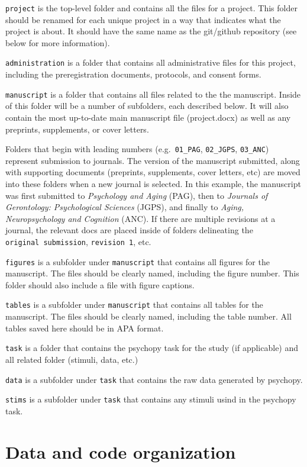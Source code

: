 \documentclass[
]{book}
\begin{document}
\texttt{project} is the top-level folder and contains all the files for a project. This folder should be renamed for each unique project in a way that indicates what the project is about. It should have the same name as the git/github repository (see below for more information).

\texttt{administration} is a folder that contains all administrative files for this project, including the preregistration documents, protocols, and consent forms.

\texttt{manuscript} is a folder that contains all files related to the the manuscript. Inside of this folder will be a number of subfolders, each described below. It will also contain the most up-to-date main manuscript file (project.docx) as well as any preprints, supplements, or cover letters.

Folders that begin with leading numbers (e.g.~\texttt{01\_PAG}, \texttt{02\_JGPS}, \texttt{03\_ANC}) represent submission to journals. The version of the manuscript submitted, along with supporting documents (preprints, supplements, cover letters, etc) are moved into these folders when a new journal is selected. In this example, the manuscript was first submitted to \emph{Psychology and Aging} (PAG), then to \emph{Journals of Gerontology: Psychological Sciences} (JGPS), and finally to \emph{Aging, Neuropsychology and Cognition} (ANC). If there are multiple revisions at a journal, the relevant docs are placed inside of folders delineating the \texttt{original\ submission}, \texttt{revision\ 1}, etc.

\texttt{figures} is a subfolder under \texttt{manuscript} that contains all figures for the manuscript. The files should be clearly named, including the figure number. This folder should also include a file with figure captions.

\texttt{tables} is a subfolder under \texttt{manuscript} that contains all tables for the manuscript. The files should be clearly named, including the table number. All tables saved here should be in APA format.

\texttt{task} is a folder that contains the psychopy task for the study (if applicable) and all related folder (stimuli, data, etc.)

\texttt{data} is a subfolder under \texttt{task} that contains the raw data generated by psychopy.

\texttt{stims} is a subfolder under \texttt{task} that contains any stimuli usind in the psychopy task.

\hypertarget{data-and-code-organization}{%
\section{Data and code organization}\label{data-and-code-organization}}
\end{document}
